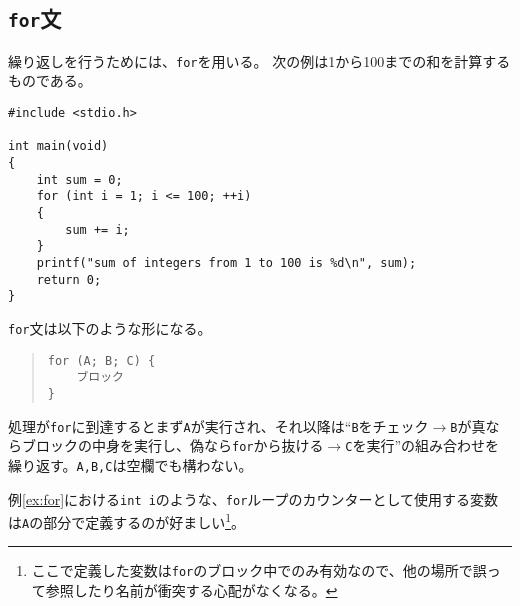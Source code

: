 \subsection{\texttt{for}文}
繰り返しを行うためには、\texttt{for}を用いる。
次の例は1から100までの和を計算するものである。
\begin{reidai}\label{ex:for}
    \begin{verbatim}
#include <stdio.h>

int main(void)
{
    int sum = 0;
    for (int i = 1; i <= 100; ++i)
    {
        sum += i;
    }
    printf("sum of integers from 1 to 100 is %d\n", sum);
    return 0;
}
\end{verbatim}
\end{reidai} \noindent
\texttt{for}文は以下のような形になる。
\begin{quote}
    \begin{verbatim}
for (A; B; C) {
    ブロック
}
\end{verbatim}
\end{quote}
処理が\texttt{for}に到達するとまず\texttt{A}が実行され、それ以降は``\texttt{B}をチェック\(\rightarrow\)\texttt{B}が真ならブロックの中身を実行し、偽なら\texttt{for}から抜ける\(\rightarrow\)\texttt{C}を実行''の組み合わせを繰り返す。\texttt{A,B,C}は空欄でも構わない。

例\ref{ex:for}における\texttt{int i}のような、\texttt{for}ループのカウンターとして使用する変数は\texttt{A}の部分で定義するのが好ましい\footnote{ここで定義した変数は\texttt{for}のブロック中でのみ有効なので、他の場所で誤って参照したり名前が衝突する心配がなくなる。}。

